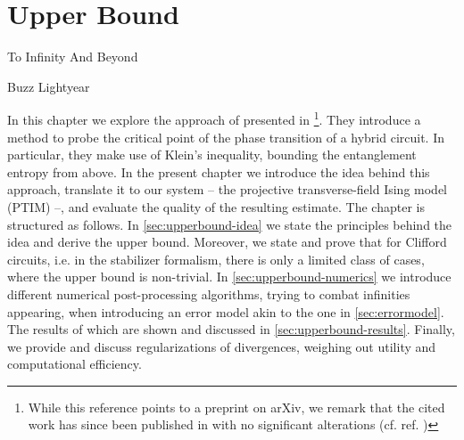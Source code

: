 \chapter{Upper Bound}
\label{ch:rel-ent}
\epigraph{To Infinity And Beyond}{Buzz Lightyear}

%
In this chapter we explore the approach of
\citeauthor{garrattProbingPostmeasurementEntanglement2023} presented in
\cite{garrattProbingPostmeasurementEntanglement2023}\footnote{While this
  reference points to a preprint on arXiv, we remark that the cited work has
since been published in
 with no
significant alterations (cf. ref.
\cite{garrattProbingPostmeasurementEntanglement2024})}. They introduce a method
to probe the critical point of the phase transition of a hybrid circuit. In
particular, they make use of Klein's inequality, bounding the entanglement
entropy from above. In the present chapter we introduce the idea behind this
approach, translate it to our system -- the projective transverse-field Ising
model (PTIM) --, and evaluate the quality of the resulting estimate. The
chapter is structured as follows. In \cref{sec:upperbound-idea} we state the
principles behind the idea and derive the upper bound. Moreover, we state and
prove that for Clifford circuits, i.e. in the stabilizer formalism, there is
only a limited class of cases, where the upper bound is non-trivial. In
\cref{sec:upperbound-numerics} we introduce different numerical post-processing
algorithms, trying to combat infinities appearing, when introducing an error
model akin to the one in \cref{sec:errormodel}. The results of which are shown
and discussed in \cref{sec:upperbound-results}. Finally, we provide and discuss
regularizations of divergences, weighing out utility and computational
efficiency.

%
%
\clearpage
